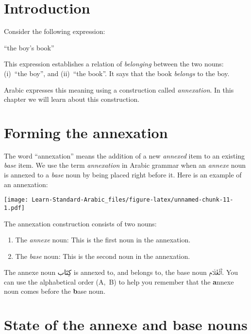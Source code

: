 \documentclass[
  10pt,
]{book}
\providecommand{\tightlist}{%
  \setlength{\itemsep}{0pt}\setlength{\parskip}{0pt}}
\begin{document}
\section{Introduction}\label{introduction-10}

Consider the following expression:

\enquote{the boy's book}

This expression establishes a relation of \emph{belonging} between the two nouns: (i)~\enquote{the boy}, and (ii)~\enquote{the book}. It says that the book \emph{belongs} to the boy.

Arabic expresses this meaning using a construction called \emph{annexation}. In this chapter we will learn about this construction.

\section{Forming the annexation}\label{forming-the-annexation}

The word \enquote{annexation} means the addition of a new \emph{annexed} item to an existing \emph{base} item. We use the term \emph{annexation} in Arabic grammar when an \emph{annexe} noun is annexed to a \emph{base} noun by being placed right before it. Here is an example of an annexation:

\texttt{[image: Learn-Standard-Arabic\_files/figure-latex/unnamed-chunk-11-1.pdf]}

The annexation construction consists of two nouns:

\begin{enumerate}
\def\labelenumi{\arabic{enumi}.}
\tightlist
\item
  The \emph{annexe} noun: This is the first noun in the annexation.
\item
  The \emph{base} noun: This is the second noun in the annexation.
\end{enumerate}

The annexe noun \foreignlanguage{arabic}{کِتَاب} is annexed to, and belongs to, the base noun \foreignlanguage{arabic}{ٱَلْغُلَام}.
You can use the alphabetical order (A,~B) to help you remember that the \textbf{a}nnexe noun comes before the \textbf{b}ase noun.

\section{State of the annexe and base nouns}\label{state-of-the-annexe-and-base-nouns}
\end{document}
